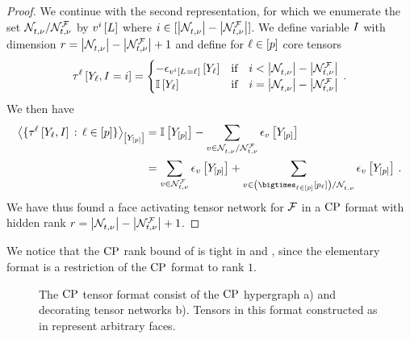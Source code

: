 \begin{proof}
    We continue with the second representation, for which we enumerate the set $\mathcal{N}_{t,\nu}^{}/\mathcal{N}_{t,\nu}^{\mathcal{F}}$ by $v^{i}\left[L\right]$ where $i\in[\left|\mathcal{N}_{t,\nu}^{}\right|-\left|\mathcal{N}_{t,\nu}^{\mathcal{F}}\right|]$.
    We define variable $I$ with dimension $r=\left|\mathcal{N}_{t,\nu}^{}\right|-\left|\mathcal{N}_{t,\nu}^{\mathcal{F}}\right|+1$ and define for $\ell\in[p]$ core tensors
    \begin{align*}
        \tau^{\ell}\left[Y_{\ell},I=i\right]
        =
        \begin{cases}
            -\epsilon_{v^{i}\left[L_{}=\ell_{}\right]}\left[Y_{\ell}\right] & \text{if}\quad i < \left|\mathcal{N}_{t,\nu}^{}\right|-\left|\mathcal{N}_{t,\nu}^{\mathcal{F}}\right| \\
            \mathbb{I}\left[Y_{\ell}\right] & \text{if}\quad i = \left|\mathcal{N}_{t,\nu}^{}\right|-\left|\mathcal{N}_{t,\nu}^{\mathcal{F}}\right|
        \end{cases} \, .
    \end{align*}
    We then have
    \begin{align*}
        \contractionof{\{\hypercoreofat{\selindex}{\headvariableof{\selindex},\decvariable}\wcols\selindexin\}}{\headvariables}
        &=\onesat{\headvariables} - \sum_{\imelement\in\genimset/\genfaceimset} \onehotmapofat{\imelement}{\headvariables} \\
        &= \sum_{\imelement\in\genfaceimset} \onehotmapofat{\imelement}{\headvariables}
        + \sum_{\imelement\in\left(\bigtimes_{\selindexin}[\seldimof{\selindex}]\right)/\genimset} \onehotmapofat{\imelement}{\headvariables} \, .
    \end{align*}
    We have thus found a face activating tensor network for $\mathcal{F}$ in a $\mathrm{CP}$ format with hidden rank $r=\left|\mathcal{N}_{t,\nu}^{}\right|-\left|\mathcal{N}_{t,\nu}^{\mathcal{F}}\right|+1$.
\end{proof}

We notice that the $\mathrm{CP}$ rank bound of  is tight in  and , since the elementary format is a restriction of the $\mathrm{CP}$ format to rank $1$.

\begin{figure}
    
    \caption{The $\mathrm{CP}$ tensor format consist of the $\mathrm{CP}$ hypergraph a) and decorating tensor networks b).
    Tensors in this format constructed as in  represent arbitrary faces.}
    \label{fig:cpFormat}
\end{figure}

